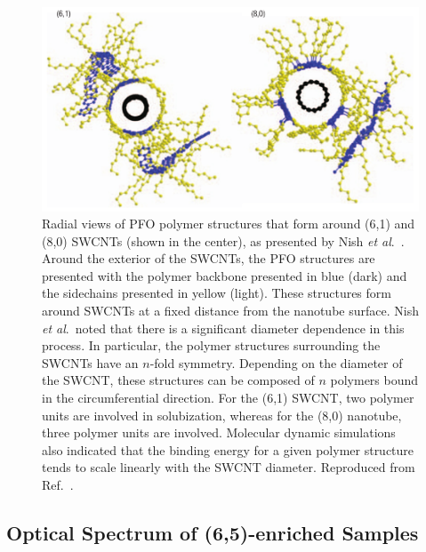 \begin{figure}[H]
	\centering
	\includegraphics[scale=0.35]{images/chapter_methods/poly_structure_nish}
	\caption{Radial views of PFO polymer structures that form around (6,1) and (8,0) SWCNTs (shown in the center), as presented by Nish \textit{et al}.\ \cite{nish2007highly}. Around the exterior of the SWCNTs, the PFO structures are presented with the polymer backbone presented in blue (dark) and the sidechains presented in yellow (light). These structures form around SWCNTs at a fixed distance from the nanotube surface. Nish \textit{et al}.\ noted that there is a significant diameter dependence in this process. In particular, the polymer structures surrounding the SWCNTs have an $n$-fold symmetry. Depending on the diameter of the SWCNT, these structures can be composed of $n$ polymers bound in the circumferential direction. For the (6,1) SWCNT, two polymer units are involved in solubization, whereas for the (8,0) nanotube, three polymer units are involved. Molecular dynamic simulations also indicated that the binding energy for a given polymer structure tends to scale linearly with the SWCNT diameter. Reproduced from Ref.\ \cite{nish2007highly}.}
	\label{fig:model_nish}
\end{figure}




\subsection{Optical Spectrum of (6,5)-enriched Samples}

